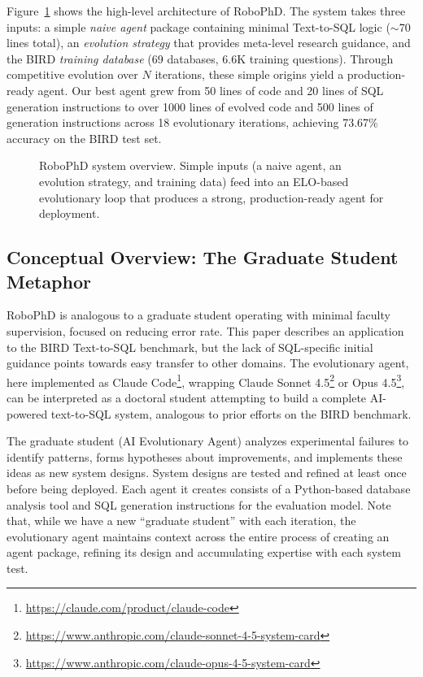 \documentclass{article}
\begin{document}
Figure~\ref{fig:system-overview} shows the high-level architecture of RoboPhD. The system takes three inputs: a simple \textit{naive agent} package containing minimal Text-to-SQL logic ($\sim$70 lines total), an \textit{evolution strategy} that provides meta-level research guidance, and the BIRD \textit{training database} (69 databases, 6.6K training questions). Through competitive evolution over $N$ iterations, these simple origins yield a production-ready agent. Our best agent grew from 50 lines of code and 20 lines of SQL generation instructions to over 1000 lines of evolved code and 500 lines of generation instructions across 18 evolutionary iterations, achieving 73.67\% accuracy on the BIRD test set.

\begin{figure}[ht]
    \centering
    
    \caption{RoboPhD system overview. Simple inputs (a naive agent, an evolution strategy, and training data) feed into an ELO-based evolutionary loop that produces a strong, production-ready agent for deployment.}
    \label{fig:system-overview}
\end{figure}

\subsection{Conceptual Overview: The Graduate Student Metaphor}
\label{subsec:academic-metaphor}

RoboPhD is analogous to a graduate student operating with minimal faculty supervision, focused on reducing error rate.  This paper describes an application to the BIRD Text-to-SQL benchmark, but the lack of SQL-specific initial guidance points towards easy transfer to other domains.  The evolutionary agent, here implemented as Claude Code\footnote{\url{https://claude.com/product/claude-code}}, wrapping Claude Sonnet 4.5\footnote{\url{https://www.anthropic.com/claude-sonnet-4-5-system-card}} or Opus 4.5\footnote{\url{https://www.anthropic.com/claude-opus-4-5-system-card}}, can be interpreted as a doctoral student attempting to build a complete AI-powered text-to-SQL system, analogous to prior efforts on the BIRD benchmark.

The graduate student (AI Evolutionary Agent) analyzes experimental failures to identify patterns, forms hypotheses about improvements, and implements these ideas as new system designs.  System designs are tested and refined at least once before being deployed. Each agent it creates consists of a Python-based database analysis tool and SQL generation instructions for the evaluation model.  Note that, while we have a new ``graduate student'' with each iteration, the evolutionary agent maintains context across the entire process of creating an agent package, refining its design and accumulating expertise with each system test.
\end{document}
